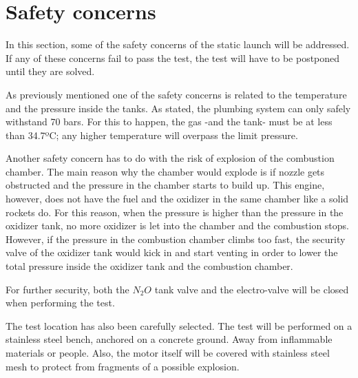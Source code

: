 
\section*{Safety concerns}

In this section, some of the safety concerns of the static launch will be addressed. If any of these concerns fail to pass the test, the test will have to be postponed until they are solved.

As previously mentioned one of the safety concerns is related to the temperature and the pressure inside the tanks. As stated, the plumbing system can only safely withstand 70 bars. For this to happen, the gas -and the tank- must be at less than 34.7ºC; any higher temperature will overpass the limit pressure.

Another safety concern has to do with the risk of explosion of the combustion chamber. The main reason why the chamber would explode is if nozzle gets obstructed and the pressure in the chamber starts to build up. This engine, however, does not have the fuel and the oxidizer in the same chamber like a solid rockets do. For this reason, when the pressure is higher than the pressure in the oxidizer tank, no more oxidizer is let into the chamber and the combustion stops. However, if the pressure in the combustion chamber climbs too fast, the security valve of the oxidizer tank would kick in and start venting in order to lower the total pressure inside the oxidizer tank and the combustion chamber.

For further security, both the $N_2O$ tank valve and the electro-valve will be closed when performing the test.

The test location has also been carefully selected. The test will be performed on a stainless steel bench, anchored on a concrete ground. Away from inflammable materials or people. Also, the motor itself will be covered with stainless steel mesh to protect from fragments of a possible explosion.
